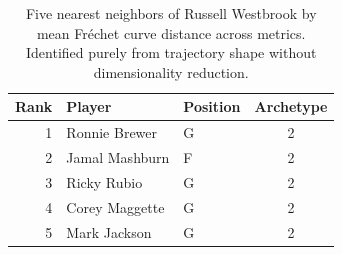 \begin{table}[htbp]
  \centering\small
  \begin{tabular}{rllc}
    \toprule
    Rank & Player & Position & Archetype \\
    \midrule
    1 & Ronnie Brewer & G & 2 \\
    2 & Jamal Mashburn & F & 2 \\
    3 & Ricky Rubio & G & 2 \\
    4 & Corey Maggette & G & 2 \\
    5 & Mark Jackson & G & 2 \\
    \bottomrule
  \end{tabular}
  \caption{Five nearest neighbors of Russell Westbrook by mean Fr\'{e}chet curve distance across metrics. Identified purely from trajectory shape without dimensionality reduction.}
  \label{tab:Russell_Westbrook_frechet_curve_neighbors}
\end{table}

